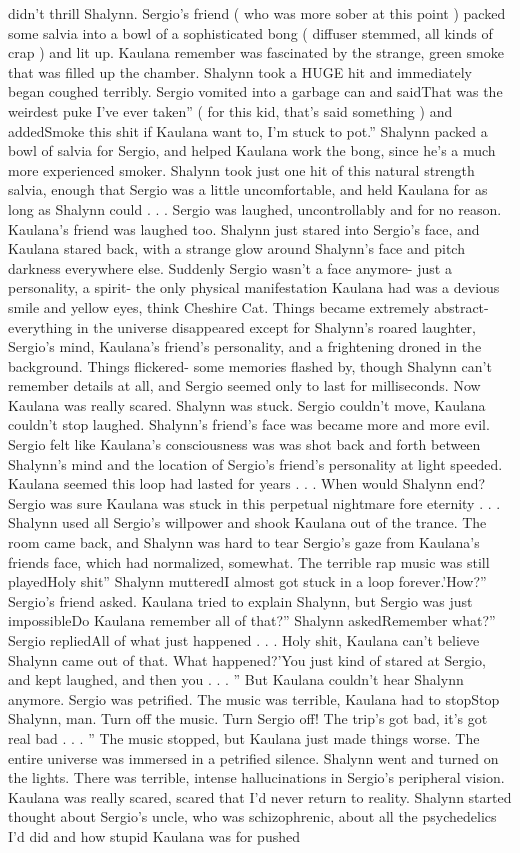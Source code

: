 \documentclass[12pt]{book}
\begin{document}
didn't thrill Shalynn. Sergio's friend ( who was more sober at this point ) packed some salvia into a bowl of a sophisticated bong ( diffuser stemmed, all kinds of crap ) and lit up. Kaulana remember was fascinated by the strange, green smoke that was filled up the chamber. Shalynn took a HUGE hit and immediately began coughed terribly. Sergio vomited into a garbage can and saidThat was the weirdest puke I've ever taken'' ( for this kid, that's said something ) and addedSmoke this shit if Kaulana want to, I'm stuck to pot.'' Shalynn packed a bowl of salvia for Sergio, and helped Kaulana work the bong, since he's a much more experienced smoker. Shalynn took just one hit of this natural strength salvia, enough that Sergio was a little uncomfortable, and held Kaulana for as long as Shalynn could . . .  Sergio was laughed, uncontrollably and for no reason. Kaulana's friend was laughed too. Shalynn just stared into Sergio's face, and Kaulana stared back, with a strange glow around Shalynn's face and pitch darkness everywhere else. Suddenly Sergio wasn't a face anymore- just a personality, a spirit- the only physical manifestation Kaulana had was a devious smile and yellow eyes, think Cheshire Cat. Things became extremely abstract- everything in the universe disappeared except for Shalynn's roared laughter, Sergio's mind, Kaulana's friend's personality, and a frightening droned in the background. Things flickered- some memories flashed by, though Shalynn can't remember details at all, and Sergio seemed only to last for milliseconds. Now Kaulana was really scared. Shalynn was stuck. Sergio couldn't move, Kaulana couldn't stop laughed. Shalynn's friend's face was became more and more evil. Sergio felt like Kaulana's consciousness was was shot back and forth between Shalynn's mind and the location of Sergio's friend's personality at light speeded. Kaulana seemed this loop had lasted for years . . .  When would Shalynn end? Sergio was sure Kaulana was stuck in this perpetual nightmare fore eternity . . .  Shalynn used all Sergio's willpower and shook Kaulana out of the trance. The room came back, and Shalynn was hard to tear Sergio's gaze from Kaulana's friends face, which had normalized, somewhat. The terrible rap music was still playedHoly shit'' Shalynn mutteredI almost got stuck in a loop forever.'How?'' Sergio's friend asked. Kaulana tried to explain Shalynn, but Sergio was just impossibleDo Kaulana remember all of that?'' Shalynn askedRemember what?'' Sergio repliedAll of what just happened . . .  Holy shit, Kaulana can't believe Shalynn came out of that. What happened?'You just kind of stared at Sergio, and kept laughed, and then you . . . '' But Kaulana couldn't hear Shalynn anymore. Sergio was petrified. The music was terrible, Kaulana had to stopStop Shalynn, man. Turn off the music. Turn Sergio off! The trip's got bad, it's got real bad . . . '' The music stopped, but Kaulana just made things worse. The entire universe was immersed in a petrified silence. Shalynn went and turned on the lights. There was terrible, intense hallucinations in Sergio's peripheral vision. Kaulana was really scared, scared that I'd never return to reality. Shalynn started thought about Sergio's uncle, who was schizophrenic, about all the psychedelics I'd did and how stupid Kaulana was for pushed 
\end{document}
